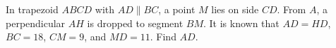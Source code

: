 In trapezoid $ABCD$ with $AD \parallel BC$, a point $M$ lies on side $CD$. From $A$, a perpendicular $AH$ is dropped to segment $BM$. It is known that $AD=HD$, $BC=18$, $CM=9$, and $MD=11$. Find $AD$.
